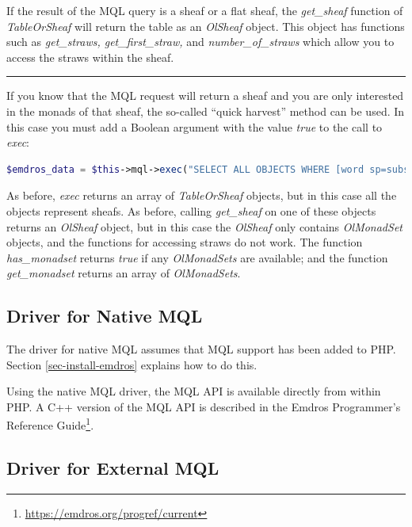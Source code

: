 \documentclass[11pt,oneside,a4paper]{memoir}
\begin{document}
If the result of the MQL query is a sheaf or a flat sheaf, the \emph{get\_sheaf} function of
\emph{TableOrSheaf} will return the table as an \emph{OlSheaf} object. This object has functions
such as \emph{get\_straws, get\_first\_straw,} and \emph{number\_of\_straws} which allow you to
access the straws within the sheaf.

\pfbreak

If you know that the MQL request will return a sheaf and you are only interested in the monads of
that sheaf, the so-called ``quick harvest'' method can be used. In
this case you must add a Boolean argument with the value \emph{true} to the call to \emph{exec}:

\begin{lstlisting}[language=PHP]
$emdros_data = $this->mql->exec("SELECT ALL OBJECTS WHERE [word sp=subs] GOqxqxqx", true);
\end{lstlisting}

As before, \emph{exec} returns an array of \emph{TableOrSheaf} objects, but in this case all the
objects represent sheafs. As before, calling \emph{get\_sheaf} on one of these objects returns an
\emph{OlSheaf} object, but in this case the \emph{OlSheaf} only contains \emph{OlMonadSet} objects, and the
functions for accessing straws do not work. The function \emph{has\_monadset} returns \emph{true} if
any \emph{OlMonadSets} are available; and the function \emph{get\_monadset} returns an array of
\emph{OlMonadSets}.

\subsection{Driver for Native MQL}\label{sec-mql-native}

The driver for native MQL assumes that MQL support has been added to PHP. Section
\ref{sec-install-emdros} explains how to do this.

Using the native MQL driver, the MQL API is available directly from within PHP. A C++
version of the MQL API is described in the Emdros Programmer's Reference
Guide\footnote{\url{https://emdros.org/progref/current}}.

\subsection{Driver for External MQL}\label{sec-mql-extern}
\end{document}
